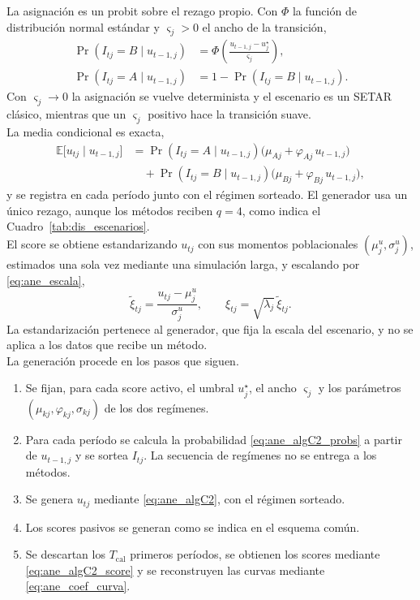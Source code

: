La asignación es un probit sobre el rezago propio. Con $\Phi$ la función de distribución normal estándar y $\varsigma_j>0$ el ancho de la transición,
\begin{align}
    \Pr(I_{tj}=B\mid u_{t-1,j}) &= \Phi\!\left(\frac{u_{t-1,j}-u_j^{\star}}{\varsigma_j}\right), \label{eq:ane_algC2_probs}\\
    \Pr(I_{tj}=A\mid u_{t-1,j}) &= 1-\Pr(I_{tj}=B\mid u_{t-1,j}). \nonumber
\end{align}
Con $\varsigma_j\to0$ la asignación se vuelve determinista y el escenario es un SETAR clásico, mientras que un $\varsigma_j$ positivo hace la transición suave.\\

La media condicional es exacta,
\begin{align}
    \mathbb{E}\bigl[u_{tj}\mid u_{t-1,j}\bigr]
    &=\Pr(I_{tj}=A\mid u_{t-1,j})\bigl(\mu_{Aj}+\varphi_{Aj}\,u_{t-1,j}\bigr) \nonumber\\
    &\quad+\Pr(I_{tj}=B\mid u_{t-1,j})\bigl(\mu_{Bj}+\varphi_{Bj}\,u_{t-1,j}\bigr), \label{eq:ane_algC2_oraculo}
\end{align}
y se registra en cada período junto con el régimen sorteado. El generador usa un único rezago, aunque los métodos reciben $q = 4$, como indica el Cuadro~\ref{tab:dis_escenarios}.\\

El score se obtiene estandarizando $u_{tj}$ con sus momentos poblacionales $(\mu_j^{u},\sigma_j^{u})$, estimados una sola vez mediante una simulación larga, y escalando por \eqref{eq:ane_escala},
\begin{equation}
\label{eq:ane_algC2_score}
\tilde{\xi}_{tj}=\frac{u_{tj}-\mu_j^{u}}{\sigma_j^{u}},
\qquad
\xi_{tj}=\sqrt{\lambda_j}\,\tilde{\xi}_{tj}.
\end{equation}
La estandarización pertenece al generador, que fija la escala del escenario, y no se aplica a los datos que recibe un método.\\

La generación procede en los pasos que siguen.
\begin{enumerate}
    \item Se fijan, para cada score activo, el umbral $u_j^{\star}$, el ancho $\varsigma_j$ y los parámetros $(\mu_{kj},\varphi_{kj},\sigma_{kj})$ de los dos regímenes.

    \item Para cada período se calcula la probabilidad \eqref{eq:ane_algC2_probs} a partir de $u_{t-1,j}$ y se sortea $I_{tj}$. La secuencia de regímenes no se entrega a los métodos.

    \item Se genera $u_{tj}$ mediante \eqref{eq:ane_algC2}, con el régimen sorteado.

    \item Los scores pasivos se generan como se indica en el esquema común.

    \item Se descartan los $T_{\mathrm{cal}}$ primeros períodos, se obtienen los scores mediante \eqref{eq:ane_algC2_score} y se reconstruyen las curvas mediante \eqref{eq:ane_coef_curva}.
\end{enumerate}

